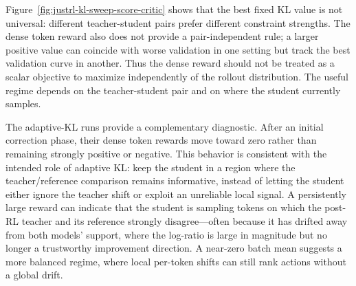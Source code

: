 Figure~\ref{fig:justrl-kl-sweep-score-critic} shows that the best fixed KL
value is not universal: different teacher-student pairs prefer different
constraint strengths. The dense token reward also does not provide a
pair-independent rule; a larger positive value can coincide with worse
validation in one setting but track the best validation curve in another. Thus
the dense reward should not be treated as a scalar objective to maximize
independently of the rollout distribution. The useful regime depends on the
teacher-student pair and on where the student currently samples.

The adaptive-KL runs provide a complementary diagnostic. After an initial
correction phase, their dense token rewards move toward zero rather than
remaining strongly positive or negative. This behavior is consistent with the
intended role of adaptive KL: keep the student in a region where the
teacher/reference comparison remains informative, instead of letting the student
either ignore the teacher shift or exploit an unreliable local signal. A
persistently large reward can indicate that the student is sampling tokens on
which the post-RL teacher and its reference strongly disagree---often because it
has drifted away from both models' support, where the log-ratio is large in
magnitude but no longer a trustworthy improvement direction. A near-zero batch
mean suggests a more balanced regime, where local per-token shifts can still
rank actions without a global drift.

